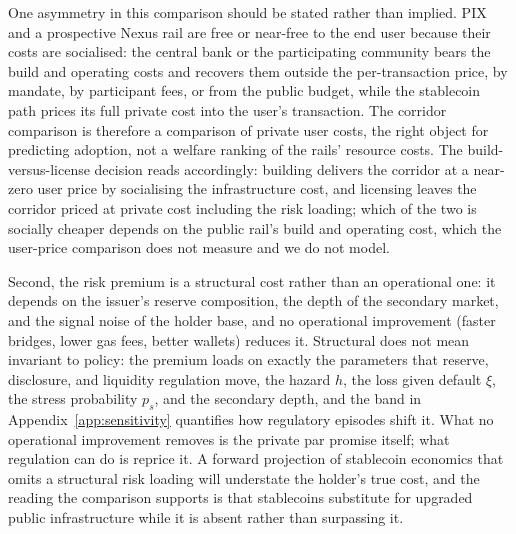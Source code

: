 One asymmetry in this comparison should be stated rather than implied. PIX and a prospective Nexus rail are free or near-free to the end user because their costs are socialised: the central bank or the participating community bears the build and operating costs and recovers them outside the per-transaction price, by mandate, by participant fees, or from the public budget, while the stablecoin path prices its full private cost into the user's transaction. The corridor comparison is therefore a comparison of private user costs, the right object for predicting adoption, not a welfare ranking of the rails' resource costs. The build-versus-license decision reads accordingly: building delivers the corridor at a near-zero user price by socialising the infrastructure cost, and licensing leaves the corridor priced at private cost including the risk loading; which of the two is socially cheaper depends on the public rail's build and operating cost, which the user-price comparison does not measure and we do not model.

Second, the risk premium is a structural cost rather than an operational one: it depends on the issuer's reserve composition, the depth of the secondary market, and the signal noise of the holder base, and no operational improvement (faster bridges, lower gas fees, better wallets) reduces it. Structural does not mean invariant to policy: the premium loads on exactly the parameters that reserve, disclosure, and liquidity regulation move, the hazard $h$, the loss given default $\xi$, the stress probability $p_s$, and the secondary depth, and the band in Appendix~\ref{app:sensitivity} quantifies how regulatory episodes shift it. What no operational improvement removes is the private par promise itself; what regulation can do is reprice it. A forward projection of stablecoin economics that omits a structural risk loading will understate the holder's true cost, and the reading the comparison supports is that stablecoins substitute for upgraded public infrastructure while it is absent rather than surpassing it.
